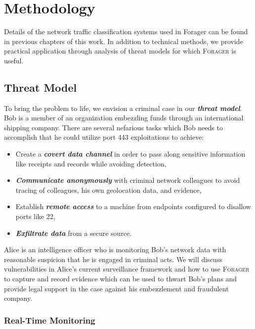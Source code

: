\section{Methodology}
Details of the network traffic classification systems used in Forager can be found in previous chapters of this work. In addition to technical methods, we provide practical application through analysis of threat models for which \textsc{Forager} is useful.

\subsection{Threat Model}
To bring the problem to life, we envision a criminal case in our \textit{\textbf{threat model}}. Bob is a member of an organization embezzling funds through an international shipping company. There are several nefarious tasks which Bob needs to accomplish that he could utilize port 443 exploitations to achieve:
\begin{itemize}
\item Create a \textbf{\textit{covert data channel}} in order to pass along sensitive information like receipts and records while avoiding detection,
\item \textbf{\textit{Communicate anonymously}} with criminal network colleagues to avoid tracing of colleagues, his own geolocation data, and evidence,
\item Establish \textbf{\textit{remote access}} to a machine from endpoints configured to disallow ports like 22,
\item \textbf{\textit{Exfiltrate data}} from a secure source.
\end{itemize}

Alice is an intelligence officer who is monitoring Bob's network data with reasonable suspicion that he is engaged in criminal acts. We will discuss vulnerabilities in Alice's current surveillance framework and how to use \textsc{Forager} to capture and record evidence which can be used to thwart Bob's plans and provide legal support in the case against his embezzlement and fraudulent company.

\subsubsection{Real-Time Monitoring}

